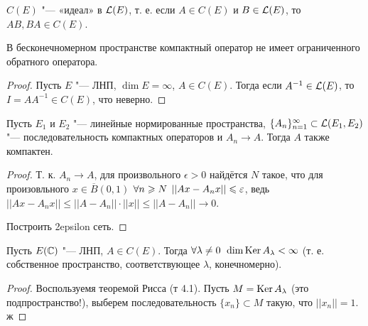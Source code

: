 \documentclass[main]{subfiles}
\begin{document}
\begin{exercise}
  \( C(E) \) "--- «идеал» в \( \Linears{E} \),
  т. е. если \( A \in C(E) \) и \( B \in \Linears{E} \),
  то \( AB, BA \in C(E) \).
\end{exercise}

\begin{corollary}
  В бесконечномерном пространстве компактный оператор
  не имеет ограниченного обратного оператора.
\end{corollary}
\begin{proof}
  Пусть \( E \) "--- ЛНП, \( \dim E = \infty \), \( A \in C(E) \).
  Тогда если \( A^{-1} \in \Linears{E} \), то
  \( I = A A^{-1} \in C(E) \), что неверно.
\end{proof}

\begin{theorem}
  Пусть \( E_1 \) и \( E_2 \) "--- линейные нормированные пространства,
  \( \{ A_n \}_{n=1}^\infty \subset \Linears{E_1, E_2} \) "---
  последовательность компактных операторов и \( A_n \to A \).
  Тогда \( A \) также компактен.
\end{theorem}
\begin{proof}
  Т. к. \( A_n \to A \), для произвольного \( \epsilon > 0 \)
  найдётся \( N \) такое, что
  для произовльного \( x \in \overline{B}(0, 1) \)
  \( \forall {n \geqslant N} \; \, ||Ax - A_nx|| \leqslant \varepsilon \),
  ведь \( ||Ax - A_n x|| \le ||A - A_n|| \cdot ||x|| \le
  ||A - A_n|| \to 0 \).

  Построить 2epsilon сеть.
\end{proof}

\begin{theorem}
  Пусть \( E(\mathbb{C}) \) "--- ЛНП, \( A \in C(E) \).
  Тогда \( \forall {\lambda \ne 0} \; \, \dim \operatorname{Ker} A_\lambda < \infty \)
  (т. е. собственное пространство, соответствующее \( \lambda \),
  конечномерно).
\end{theorem}
\begin{proof}
  Воспользуемя теоремой Рисса (т 4.1).
  Пусть \( M = \operatorname{Ker} A_\lambda \) (это подпространство!),
  выберем последовательность \( \{ x_n \} \subset M \) такую,
  что \(  ||x_n|| = 1 \).
  ж
\end{proof}
\end{document}
